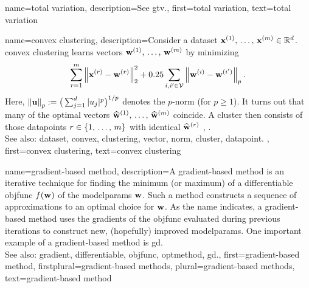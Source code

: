 {name={total variation}, 
	description={See \gls{gtv}.},
	first={total variation},
	text={total variation} 
}


 {name={convex clustering}, 
 	description={Consider a \gls{dataset} 
 		${\bf x}^{(1)}, \,\ldots, \,{\bf x}^{(m)} \in \mathbb{R}^{d}$. 
 		\Gls{convex} \gls{clustering} learns \glspl{vector} ${\bf w}^{(1)}, \,\ldots, \,{\bf w}^{(m)}$ by minimizing 
 		$$\sum_{r=1}^{m} \left\Vert {{\bf x}^{(r)} - {\bf w}^{(r)}} \right\Vert_{2}^2 + 
 		0.25 \sum_{i,i' \in \mathcal{V}} \left\Vert {{\bf w}^{(i)} - {\bf w}^{(i')}} \right\Vert_{p}.$$ 
		Here, $\left\Vert {{\bf u}} \right\Vert_{p} := \big( \sum_{j=1}^{d} |u_{j}|^{p} \big)^{1/p}$ 
		denotes the $p$-\gls{norm} (for $p\geq1$).  
		It turns out that many of the optimal \glspl{vector} $\widehat{{\bf w}}^{(1)}, \,\ldots, \,\widehat{{\bf w}}^{(m)}$ 
		coincide. A \gls{cluster} then consists of those \glspl{datapoint} $r \in \{1, \,\ldots, \,m\}$ 
		with identical $\widehat{{\bf w}}^{(r)}$ \cite{JMLR:v22:18-694}, \cite{Pelckmans2005}. 
			\\
		See also: \gls{dataset}, \gls{convex}, \gls{clustering}, \gls{vector}, \gls{norm}, \gls{cluster}, \gls{datapoint}. },
 	first={convex clustering},
	text={convex clustering} 
}


{name={gradient-based method}, 
	description={A \Gls{gradient}-based 
		method is an iterative technique for finding the \gls{minimum} (or \gls{maximum}) 
		of a \gls{differentiable} \gls{objfunc} $f({\bf w})$ of the \glspl{modelparam} ${\bf w}$. 
		Such a method constructs a sequence of approximations to an optimal choice for ${\bf w}$. 
		As the name indicates, a \gls{gradient}-based method uses the \glspl{gradient} 
		of the \gls{objfunc} evaluated during previous iterations to construct new, 
		(hopefully) improved \glspl{modelparam}. One important example of a \gls{gradient}-based 
		method is \gls{gd}.
				\\
		See also: \gls{gradient}, \gls{differentiable}, \gls{objfunc}, \gls{optmethod}, \gls{gd}.},
	first={gradient-based method},
	firstplural={gradient-based methods},
	plural={gradient-based methods},
	text={gradient-based method} 
}


